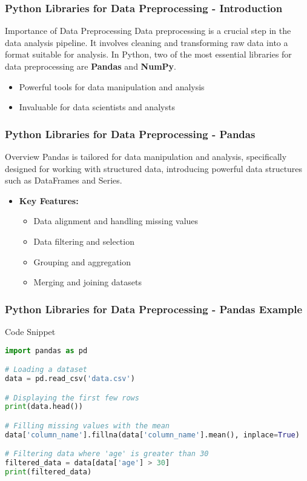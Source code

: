 \documentclass[aspectratio=169]{beamer}
\begin{document}
\begin{frame}
    \frametitle{Python Libraries for Data Preprocessing - Introduction}
    \begin{block}{Importance of Data Preprocessing}
        Data preprocessing is a crucial step in the data analysis pipeline. It involves cleaning and transforming raw data into a format suitable for analysis. In Python, two of the most essential libraries for data preprocessing are \textbf{Pandas} and \textbf{NumPy}.
    \end{block}
    \begin{itemize}
        \item Powerful tools for data manipulation and analysis
        \item Invaluable for data scientists and analysts
    \end{itemize}
\end{frame}

\begin{frame}
    \frametitle{Python Libraries for Data Preprocessing - Pandas}
    \begin{block}{Overview}
        Pandas is tailored for data manipulation and analysis, specifically designed for working with structured data, introducing powerful data structures such as DataFrames and Series.
    \end{block}
    \begin{itemize}
        \item \textbf{Key Features:}
        \begin{itemize}
            \item Data alignment and handling missing values
            \item Data filtering and selection
            \item Grouping and aggregation
            \item Merging and joining datasets
        \end{itemize}
    \end{itemize}
\end{frame}

\begin{frame}[fragile]
    \frametitle{Python Libraries for Data Preprocessing - Pandas Example}
    \begin{block}{Code Snippet}
        \begin{lstlisting}[language=Python]
import pandas as pd

# Loading a dataset
data = pd.read_csv('data.csv')

# Displaying the first few rows
print(data.head())

# Filling missing values with the mean
data['column_name'].fillna(data['column_name'].mean(), inplace=True)

# Filtering data where 'age' is greater than 30
filtered_data = data[data['age'] > 30]
print(filtered_data)
        \end{lstlisting}
    \end{block}
\end{frame}
\end{document}
